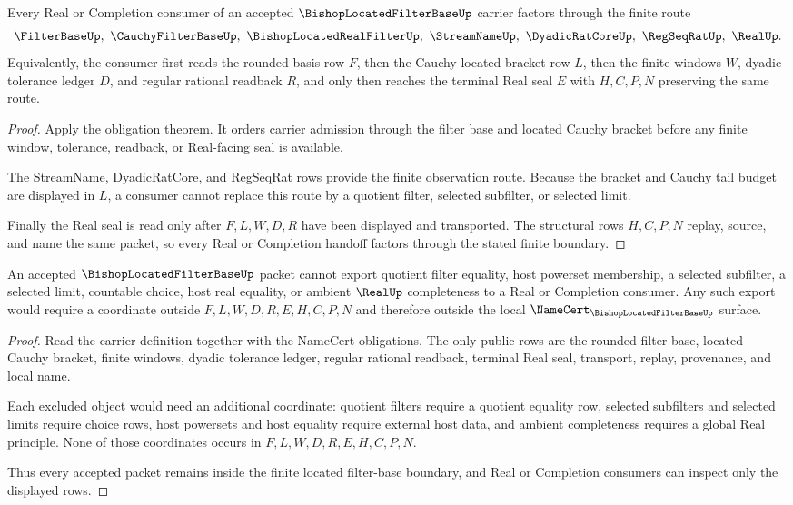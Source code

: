 \begin{theorem}
\label{thm:bishop-located-filter-base-real-handoff}
Every Real or Completion consumer of an accepted $\BishopLocatedFilterBaseUp$ carrier factors through the finite route
$$
\FilterBaseUp,\ \CauchyFilterBaseUp,\ \BishopLocatedRealFilterUp,\ \StreamNameUp,\ \DyadicRatCoreUp,\ \RegSeqRatUp,\ \RealUp .
$$
Equivalently, the consumer first reads the rounded basis row $F$, then the Cauchy located-bracket row $L$, then the finite windows $W$, dyadic tolerance ledger $D$, and regular rational readback $R$, and only then reaches the terminal Real seal $E$ with $H,C,P,N$ preserving the same route.
\end{theorem}
\begin{proof}
Apply the obligation theorem. It orders carrier admission through the filter base and located Cauchy bracket before any finite window, tolerance, readback, or Real-facing seal is available.

The StreamName, DyadicRatCore, and RegSeqRat rows provide the finite observation route. Because the bracket and Cauchy tail budget are displayed in $L$, a consumer cannot replace this route by a quotient filter, selected subfilter, or selected limit.

Finally the Real seal is read only after $F,L,W,D,R$ have been displayed and transported. The structural rows $H,C,P,N$ replay, source, and name the same packet, so every Real or Completion handoff factors through the stated finite boundary.
\end{proof}

\begin{theorem}
\label{thm:bishop-located-filter-base-nonescape}
An accepted $\BishopLocatedFilterBaseUp$ packet cannot export quotient filter equality, host powerset membership, a selected subfilter, a selected limit, countable choice, host real equality, or ambient $\RealUp$ completeness to a Real or Completion consumer. Any such export would require a coordinate outside $F,L,W,D,R,E,H,C,P,N$ and therefore outside the local $\NameCert_{\BishopLocatedFilterBaseUp}$ surface.
\end{theorem}
\begin{proof}
Read the carrier definition together with the NameCert obligations. The only public rows are the rounded filter base, located Cauchy bracket, finite windows, dyadic tolerance ledger, regular rational readback, terminal Real seal, transport, replay, provenance, and local name.

Each excluded object would need an additional coordinate: quotient filters require a quotient equality row, selected subfilters and selected limits require choice rows, host powersets and host equality require external host data, and ambient completeness requires a global Real principle. None of those coordinates occurs in $F,L,W,D,R,E,H,C,P,N$.

Thus every accepted packet remains inside the finite located filter-base boundary, and Real or Completion consumers can inspect only the displayed rows.
\end{proof}

